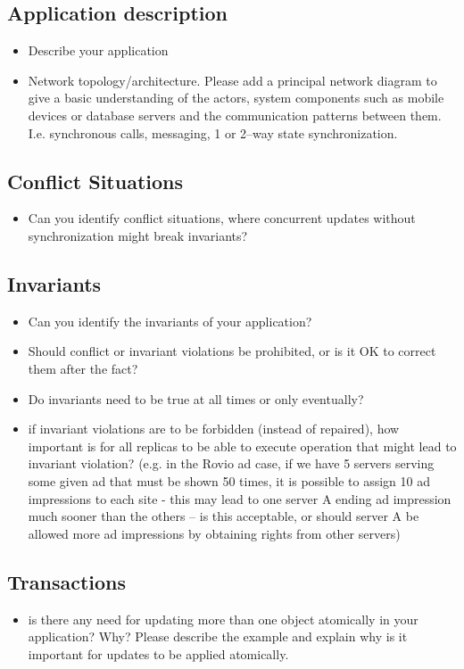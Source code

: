 \documentclass[11pt,a4paper]{report}
\begin{document}
\subsection{Application description}
\begin{itemize}
\item Describe your application
\item Network topology/architecture.
Please add a principal network diagram to give a basic understanding of the actors, system components such as mobile devices or database servers and the communication patterns between them. I.e. synchronous calls, messaging, 1 or 2--way state synchronization.
\end{itemize}

\subsection{Conflict Situations}
\begin{itemize}
\item Can you identify conflict situations, where concurrent updates without synchronization might break invariants?
\end{itemize}

\subsection{Invariants}
\begin{itemize}
\item Can you identify the invariants of your application?
\item Should conflict or invariant violations be prohibited, or is it OK to correct them after the fact?
\item Do invariants need to be true at all times or only eventually?
\item if invariant violations are to be forbidden (instead of repaired), how important is for all replicas to be able to execute operation that might lead to invariant violation? 
(e.g. in the Rovio ad case, if we have 5 servers serving some given ad that must be shown 50 times, it is possible to assign 10 ad impressions to each site - this may lead to one server A ending ad impression much sooner than the others -- is this acceptable, or should server A be allowed more ad impressions by obtaining rights from other servers)
\end{itemize}

\subsection{Transactions}
\begin{itemize}
\item is there any need for updating more than one object atomically in your application? Why?
Please describe the example and explain why is it important for updates to be applied atomically.
\end{itemize}
\end{document}
